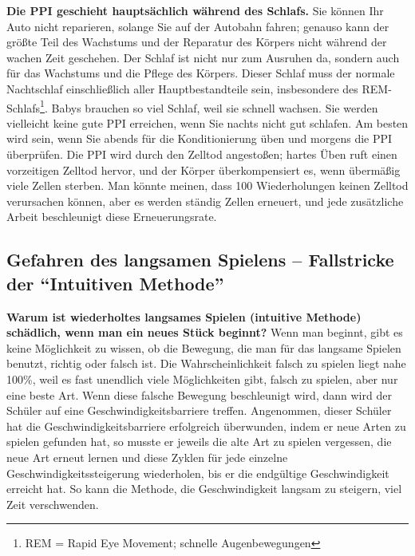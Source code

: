 \textbf{Die PPI geschieht hauptsächlich während des Schlafs.}
Sie können Ihr Auto nicht reparieren, solange Sie auf der Autobahn fahren; genauso kann der größte Teil des Wachstums und der Reparatur des Körpers nicht während der wachen Zeit geschehen.
Der Schlaf ist nicht nur zum Ausruhen da, sondern auch für das Wachstums und die Pflege des Körpers.
Dieser Schlaf muss der normale Nachtschlaf einschließlich aller Hauptbestandteile sein, insbesondere des REM-Schlafs\footnote{REM = Rapid Eye Movement; schnelle Augenbewegungen}.
Babys brauchen so viel Schlaf, weil sie schnell wachsen.
Sie werden vielleicht keine gute PPI erreichen, wenn Sie nachts nicht gut schlafen.
Am besten wird sein, wenn Sie abends für die Konditionierung üben und morgens die PPI überprüfen.
Die PPI wird durch den Zelltod angestoßen; hartes Üben ruft einen vorzeitigen Zelltod hervor, und der Körper überkompensiert es, wenn übermäßig viele Zellen sterben.
Man könnte meinen, dass 100 Wiederholungen keinen Zelltod verursachen können, aber es werden ständig Zellen  erneuert, und jede zusätzliche Arbeit beschleunigt diese Erneuerungsrate.


\subsection{Gefahren des langsamen Spielens -- Fallstricke der \enquote{Intuitiven Methode}}
\label{c1ii16}

\textbf{Warum ist wiederholtes langsames Spielen (intuitive Methode) schädlich, wenn man ein neues Stück beginnt?}
Wenn man beginnt, gibt es keine Möglichkeit zu wissen, ob die Bewegung, die man für das langsame Spielen benutzt, richtig oder falsch ist.
Die Wahrscheinlichkeit falsch zu spielen liegt nahe 100\%, weil es fast unendlich viele Möglichkeiten gibt, falsch zu spielen, aber nur eine beste Art.
Wenn diese falsche Bewegung beschleunigt wird, dann wird der Schüler auf eine Geschwindigkeitsbarriere treffen.
Angenommen, dieser Schüler hat die Geschwindigkeitsbarriere erfolgreich überwunden, indem er neue Arten zu spielen gefunden hat, so musste er jeweils die alte Art zu spielen vergessen, die neue Art erneut lernen und diese Zyklen für jede einzelne Geschwindigkeitssteigerung wiederholen, bis er die endgültige Geschwindigkeit erreicht hat.
So kann die Methode, die Geschwindigkeit langsam zu steigern, viel Zeit verschwenden.


